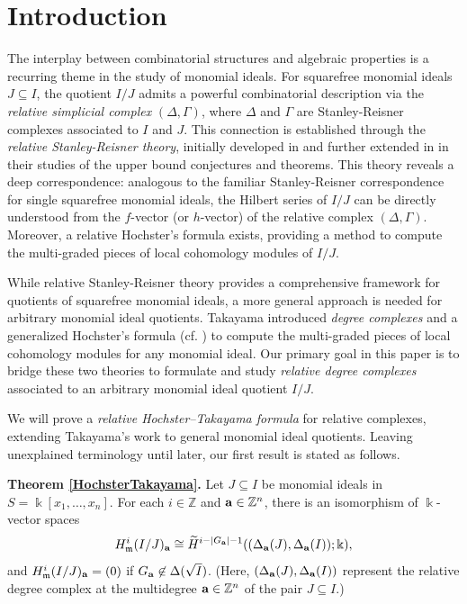 \documentclass[12pt]{amsart}
\numberwithin{equation}{section}
\theoremstyle{definition}
\theoremstyle{definition}
\newcommand{\ZZ}{{\mathbb Z}}
\def\kk{{\Bbbk}}
\def\mm{{\mathfrak m}}
\def\a{{\bold a}}
\begin{document}
\section{Introduction} \label{sec.intro}

The interplay between combinatorial structures and algebraic properties is a recurring theme in the study of monomial ideals. For squarefree monomial ideals $J \subseteq I$, the quotient $I/J$ admits a powerful combinatorial description via the \textit{relative simplicial complex} $(\Delta,\Gamma)$, where $\Delta$ and $\Gamma$ are Stanley-Reisner complexes associated to $I$ and $J$. This connection is established through the \textit{relative Stanley-Reisner theory}, initially developed in \cite{Stanley} and further extended in \cite{AS2016} in their studies of the upper bound conjectures and theorems. 
This theory reveals a deep correspondence: analogous to the familiar Stanley-Reisner correspondence for single squarefree monomial ideals, the Hilbert series of $I/J$ can be directly understood from the $f$-vector (or $h$-vector) of the relative complex $(\Delta,\Gamma)$. Moreover, a relative Hochster's formula exists, providing a method to compute the multi-graded pieces of local cohomology modules of $I/J$.

While relative Stanley-Reisner theory provides a comprehensive framework for quotients of squarefree monomial ideals, a more general approach is needed for arbitrary monomial ideal quotients. Takayama \cite{T2005} introduced \textit{degree complexes} and a generalized Hochster's formula (cf. \cite{Hochster}) to compute the multi-graded pieces of local cohomology modules for any monomial ideal. Our primary goal in this paper is to bridge these two theories to formulate and study \emph{relative degree complexes} associated to an arbitrary monomial ideal quotient $I/J$. 

We will prove a \textit{relative Hochster--Takayama formula} for relative complexes, extending Takayama's work to general monomial ideal quotients. Leaving unexplained terminology until later, our first result is stated as follows.

\medskip

\noindent \textbf{Theorem \ref{HochsterTakayama}.} Let $J\subseteq I$ be monomial ideals in $S = \kk[x_1, \dots, x_n]$. For each $i\in\ZZ$ and $\a\in\ZZ^n$, there is an isomorphism of $\kk$-vector spaces
$$H_{\mm}^{i}(I/J)_{\a}\cong \widetilde{H}^{i-|G_\a|-1}((\Delta_\a(J),\Delta_\a(I)); \kk),$$
and $H_{\mm}^{i}(I/J)_{\a}=(0)$ if $G_\a \not\in \Delta(\sqrt{I})$. (Here, $(\Delta_\a(J),\Delta_\a(I))$ represent the relative degree complex at the multidegree $\a \in \ZZ^n$ of the pair $J \subseteq I$.)
 
\end{document}
